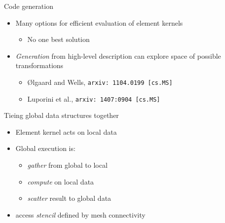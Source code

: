 \documentclass[presentation]{beamer}
\begin{document}
\begin{frame}[fragile,label=sec-3-4]{Code generation}
 \begin{itemize}
\item Many options for efficient evaluation of element kernels
\begin{itemize}
\item No one best solution
\end{itemize}
\item \emph{Generation} from high-level description can explore space of
possible transformations
\begin{itemize}
\item Ølgaard and Wells, \verb~arxiv: 1104.0199 [cs.MS]~
\item Luporini et al., \verb~arxiv: 1407:0904 [cs.MS]~
\end{itemize}
\end{itemize}
\end{frame}

\begin{frame}[label=sec-3-5]{Tieing global data structures together}
\begin{itemize}
\item Element kernel acts on local data
\item Global execution is:
\begin{itemize}
\item \emph{gather} from global to local
\item \emph{compute} on local data
\item \emph{scatter} result to global data
\end{itemize}
\item access \emph{stencil} defined by mesh connectivity
\end{itemize}
\end{frame}
\end{document}
